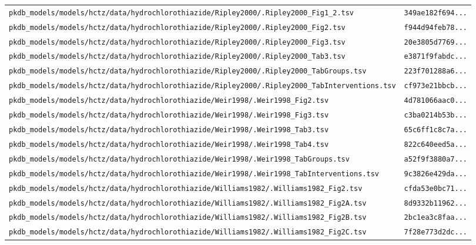\begin{longtable}{ll}
\texttt{pkdb\_models/models/hctz/data/hydrochlorothiazide/Ripley2000/.Ripley2000\_Fig1\_2.tsv} & \texttt{349ae182f694...} \\
\texttt{pkdb\_models/models/hctz/data/hydrochlorothiazide/Ripley2000/.Ripley2000\_Fig2.tsv} & \texttt{f944d94feb78...} \\
\texttt{pkdb\_models/models/hctz/data/hydrochlorothiazide/Ripley2000/.Ripley2000\_Fig3.tsv} & \texttt{20e3805d7769...} \\
\texttt{pkdb\_models/models/hctz/data/hydrochlorothiazide/Ripley2000/.Ripley2000\_Tab3.tsv} & \texttt{e3871f9fabdc...} \\
\texttt{pkdb\_models/models/hctz/data/hydrochlorothiazide/Ripley2000/.Ripley2000\_TabGroups.tsv} & \texttt{223f701288a6...} \\
\texttt{pkdb\_models/models/hctz/data/hydrochlorothiazide/Ripley2000/.Ripley2000\_TabInterventions.tsv} & \texttt{cf973e21bbcb...} \\
\texttt{pkdb\_models/models/hctz/data/hydrochlorothiazide/Weir1998/.Weir1998\_Fig2.tsv} & \texttt{4d781066aac0...} \\
\texttt{pkdb\_models/models/hctz/data/hydrochlorothiazide/Weir1998/.Weir1998\_Fig3.tsv} & \texttt{c3ba0214b53b...} \\
\texttt{pkdb\_models/models/hctz/data/hydrochlorothiazide/Weir1998/.Weir1998\_Tab3.tsv} & \texttt{65c6ff1c8c7a...} \\
\texttt{pkdb\_models/models/hctz/data/hydrochlorothiazide/Weir1998/.Weir1998\_Tab4.tsv} & \texttt{822c640eed5a...} \\
\texttt{pkdb\_models/models/hctz/data/hydrochlorothiazide/Weir1998/.Weir1998\_TabGroups.tsv} & \texttt{a52f9f3880a7...} \\
\texttt{pkdb\_models/models/hctz/data/hydrochlorothiazide/Weir1998/.Weir1998\_TabInterventions.tsv} & \texttt{9c3826e429da...} \\
\texttt{pkdb\_models/models/hctz/data/hydrochlorothiazide/Williams1982/.Williams1982\_Fig2.tsv} & \texttt{cfda53e0bc71...} \\
\texttt{pkdb\_models/models/hctz/data/hydrochlorothiazide/Williams1982/.Williams1982\_Fig2A.tsv} & \texttt{8d9332b11962...} \\
\texttt{pkdb\_models/models/hctz/data/hydrochlorothiazide/Williams1982/.Williams1982\_Fig2B.tsv} & \texttt{2bc1ea3c8faa...} \\
\texttt{pkdb\_models/models/hctz/data/hydrochlorothiazide/Williams1982/.Williams1982\_Fig2C.tsv} & \texttt{7f28e773d2dc...} \\

\end{longtable}

